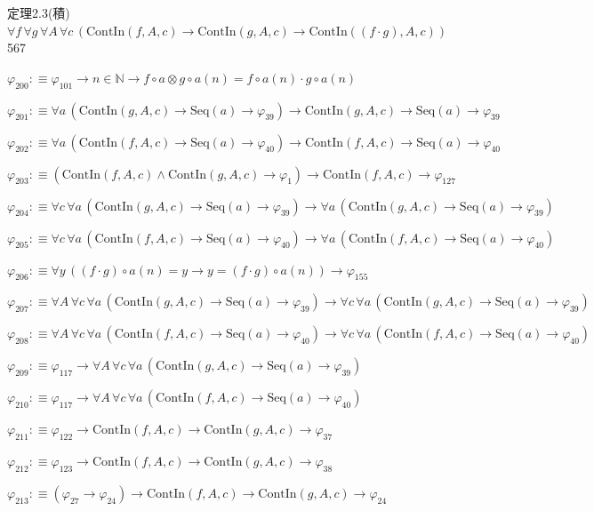 \begin{fullproof}{定理2.3(積)}{$\forall f\,\forall g\,\forall A\,\forall c\,(\mathrm{ContIn}(f,A,c) \to \mathrm{ContIn}(g,A,c) \to \mathrm{ContIn}((f \cdot g),A,c))$}{567}
\begin{abbrevlist}
\item $\varphi_{200} :\equiv \varphi_{101} \to n \in \mathbb{N} \to f \circ a \otimes g \circ a(n) = f \circ a(n) \cdot g \circ a(n)$
\item $\varphi_{201} :\equiv \forall a\,(\mathrm{ContIn}(g,A,c) \to \mathrm{Seq}(a) \to \varphi_{39}) \to \mathrm{ContIn}(g,A,c) \to \mathrm{Seq}(a) \to \varphi_{39}$
\item $\varphi_{202} :\equiv \forall a\,(\mathrm{ContIn}(f,A,c) \to \mathrm{Seq}(a) \to \varphi_{40}) \to \mathrm{ContIn}(f,A,c) \to \mathrm{Seq}(a) \to \varphi_{40}$
\item $\varphi_{203} :\equiv (\mathrm{ContIn}(f,A,c) \land \mathrm{ContIn}(g,A,c) \to \varphi_{1}) \to \mathrm{ContIn}(f,A,c) \to \varphi_{127}$
\item $\varphi_{204} :\equiv \forall c\,\forall a\,(\mathrm{ContIn}(g,A,c) \to \mathrm{Seq}(a) \to \varphi_{39}) \to \forall a\,(\mathrm{ContIn}(g,A,c) \to \mathrm{Seq}(a) \to \varphi_{39})$
\item $\varphi_{205} :\equiv \forall c\,\forall a\,(\mathrm{ContIn}(f,A,c) \to \mathrm{Seq}(a) \to \varphi_{40}) \to \forall a\,(\mathrm{ContIn}(f,A,c) \to \mathrm{Seq}(a) \to \varphi_{40})$
\item $\varphi_{206} :\equiv \forall y\,((f \cdot g) \circ a(n) = y \to y = (f \cdot g) \circ a(n)) \to \varphi_{155}$
\item $\varphi_{207} :\equiv \forall A\,\forall c\,\forall a\,(\mathrm{ContIn}(g,A,c) \to \mathrm{Seq}(a) \to \varphi_{39}) \to \forall c\,\forall a\,(\mathrm{ContIn}(g,A,c) \to \mathrm{Seq}(a) \to \varphi_{39})$
\item $\varphi_{208} :\equiv \forall A\,\forall c\,\forall a\,(\mathrm{ContIn}(f,A,c) \to \mathrm{Seq}(a) \to \varphi_{40}) \to \forall c\,\forall a\,(\mathrm{ContIn}(f,A,c) \to \mathrm{Seq}(a) \to \varphi_{40})$
\item $\varphi_{209} :\equiv \varphi_{117} \to \forall A\,\forall c\,\forall a\,(\mathrm{ContIn}(g,A,c) \to \mathrm{Seq}(a) \to \varphi_{39})$
\item $\varphi_{210} :\equiv \varphi_{117} \to \forall A\,\forall c\,\forall a\,(\mathrm{ContIn}(f,A,c) \to \mathrm{Seq}(a) \to \varphi_{40})$
\item $\varphi_{211} :\equiv \varphi_{122} \to \mathrm{ContIn}(f,A,c) \to \mathrm{ContIn}(g,A,c) \to \varphi_{37}$
\item $\varphi_{212} :\equiv \varphi_{123} \to \mathrm{ContIn}(f,A,c) \to \mathrm{ContIn}(g,A,c) \to \varphi_{38}$
\item $\varphi_{213} :\equiv (\varphi_{27} \to \varphi_{24}) \to \mathrm{ContIn}(f,A,c) \to \mathrm{ContIn}(g,A,c) \to \varphi_{24}$

\end{abbrevlist}
\end{fullproof}
